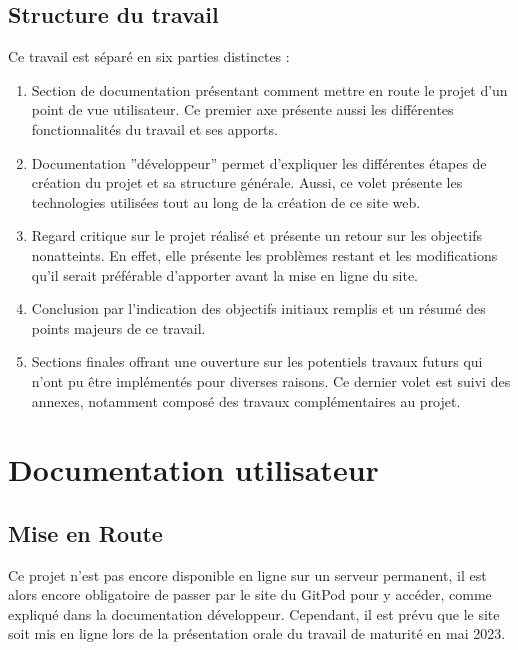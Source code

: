 \documentclass[a4,10pt,french]{sphinxmanual}
\begin{document}
\section{Structure du travail}
\label{\detokenize{introduction:structure-du-travail}}
\sphinxAtStartPar
Ce travail est séparé en six parties distinctes :
\begin{enumerate}
%
\item {} 
\sphinxAtStartPar
Section de documentation présentant comment mettre en route le projet d’un point de vue utilisateur. Ce premier axe présente aussi les différentes fonctionnalités du travail et ses apports.

\item {} 
\sphinxAtStartPar
Documentation ”développeur” permet d’expliquer les différentes étapes de création du projet et sa structure générale. Aussi, ce volet présente les technologies utilisées tout au long de la création de ce site web.

\item {} 
\sphinxAtStartPar
Regard critique sur le projet réalisé et présente un retour sur les objectifs non\sphinxhyphen{}atteints. En effet, elle présente les problèmes restant et les modifications qu’il serait préférable d’apporter avant la mise en ligne du site.

\item {} 
\sphinxAtStartPar
Conclusion par l’indication des objectifs initiaux remplis et un résumé des points majeurs de ce travail.

\item {} 
\sphinxAtStartPar
Sections finales offrant une ouverture sur les potentiels travaux futurs qui n’ont pu être implémentés pour diverses raisons. Ce dernier volet est suivi des annexes, notamment composé des travaux complémentaires au projet.

\end{enumerate}

\sphinxAtStartPar



\chapter{Documentation utilisateur}
\label{\detokenize{chapitre-01:documentation-utilisateur}}\label{\detokenize{chapitre-01::doc}}

\section{Mise en Route}
\label{\detokenize{chapitre-01:mise-en-route}}
\sphinxAtStartPar
Ce projet n’est pas encore disponible en ligne sur un serveur permanent, il est alors encore obligatoire de passer par le site du GitPod pour y accéder, comme expliqué dans la documentation développeur. Cependant, il est prévu que le site soit mis en ligne lors de la présentation orale du travail de maturité en mai 2023.
\end{document}

